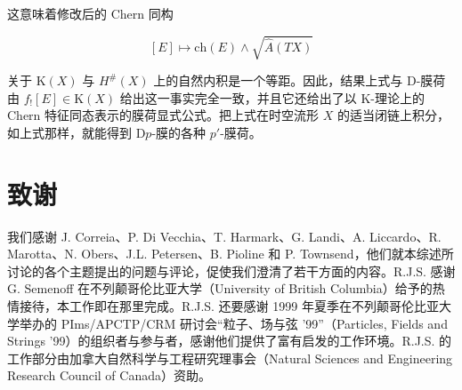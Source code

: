 \documentclass[11pt,a4paper]{ctexart}
\newcommand{\SrcRange}[2]{\marginpar{\raggedright\footnotesize 原文 p.#1}}
\begin{document}
这意味着修改后的 Chern 同构

\[[E]\longmapsto\mathrm{ch}(E)\wedge\sqrt{\widehat{A}(TX)}\]

关于 \({\mathrm K}(X)\) 与 \(H^\#(X)\) 上的自然内积是一个等距。因此，结果上式与 D-膜荷由 \(f_![E]\in {\mathrm K}(X)\) 给出这一事实完全一致，并且它还给出了以 K-理论上的 Chern 特征同态表示的膜荷显式公式。把上式在时空流形 \(X\) 的适当闭链上积分，如上式那样，就能得到 D\(p\)-膜的各种 \(p'\)-膜荷。

\SrcRange{106}{106}
\section{致谢}\label{ux81f4ux8c22}

我们感谢 J. Correia、P. Di Vecchia、T. Harmark、G. Landi、A. Liccardo、R. Marotta、N. Obers、J.L. Petersen、B. Pioline 和 P. Townsend，他们就本综述所讨论的各个主题提出的问题与评论，促使我们澄清了若干方面的内容。R.J.S. 感谢 G. Semenoff 在不列颠哥伦比亚大学（University of British Columbia）给予的热情接待，本工作即在那里完成。R.J.S. 还要感谢 1999 年夏季在不列颠哥伦比亚大学举办的 PIms/APCTP/CRM 研讨会``粒子、场与弦 '99''（Particles, Fields and Strings '99）的组织者与参与者，感谢他们提供了富有启发的工作环境。R.J.S. 的工作部分由加拿大自然科学与工程研究理事会（Natural Sciences and Engineering Research Council of Canada）资助。
\end{document}
